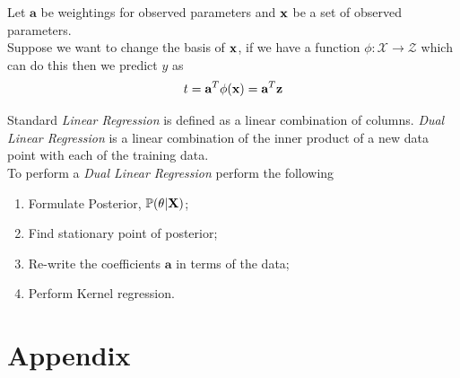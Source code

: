 \documentclass[11pt,a4paper]{article}
\begin{document}
Let $\textbf{a}$ be weightings for observed parameters and $\textbf{x}$ be a set of observed parameters.\\
Suppose we want to change the basis of $\textbf{x}$, if we have a function $\phi:\mathcal{X}\to\mathcal{Z}$ which can do this then we predict $y$ as
$$t=\textbf{a}^T\phi(\textbf{x})=\textbf{a}^T\textbf{z}$$

Standard \textit{Linear Regression} is defined as a linear combination of columns. \textit{Dual Linear Regression} is a linear combination of the inner product of a new data point with each of the training data.\\

To perform a \textit{Dual Linear Regression} perform the following
\begin{enumerate}[label=\roman*)]
	\item Formulate Posterior, $\mathbb{P}(\theta|\textbf{X})$;
	\item Find stationary point of posterior;
	\item Re-write the coefficients $\textbf{a}$ in terms of the data;
	\item Perform Kernel regression.
\end{enumerate}

\newpage
\setcounter{section}{-1}
\section{Appendix}
\end{document}
